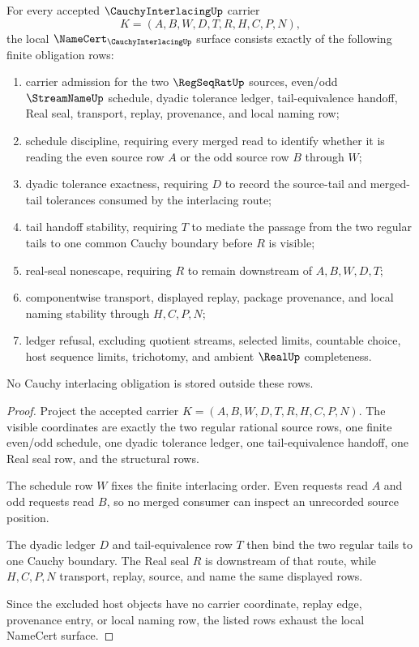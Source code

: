 \begin{theorem}
\label{thm:cauchy-interlacing-namecert-obligations}
For every accepted $\CauchyInterlacingUp$ carrier
$$
K=(A,B,W,D,T,R,H,C,P,N),
$$
the local $\NameCert_{\CauchyInterlacingUp}$ surface consists exactly of the following finite obligation rows:
\begin{enumerate}
\item carrier admission for the two $\RegSeqRatUp$ sources, even/odd $\StreamNameUp$ schedule, dyadic tolerance ledger, tail-equivalence handoff, Real seal, transport, replay, provenance, and local naming row;
\item schedule discipline, requiring every merged read to identify whether it is reading the even source row $A$ or the odd source row $B$ through $W$;
\item dyadic tolerance exactness, requiring $D$ to record the source-tail and merged-tail tolerances consumed by the interlacing route;
\item tail handoff stability, requiring $T$ to mediate the passage from the two regular tails to one common Cauchy boundary before $R$ is visible;
\item real-seal nonescape, requiring $R$ to remain downstream of $A,B,W,D,T$;
\item componentwise transport, displayed replay, package provenance, and local naming stability through $H,C,P,N$;
\item ledger refusal, excluding quotient streams, selected limits, countable choice, host sequence limits, trichotomy, and ambient $\RealUp$ completeness.
\end{enumerate}
No Cauchy interlacing obligation is stored outside these rows.
\end{theorem}

\begin{proof}
Project the accepted carrier $K=(A,B,W,D,T,R,H,C,P,N)$. The visible coordinates are exactly the two regular rational source rows, one finite even/odd schedule, one dyadic tolerance ledger, one tail-equivalence handoff, one Real seal row, and the structural rows.

The schedule row $W$ fixes the finite interlacing order. Even requests read $A$ and odd requests read $B$, so no merged consumer can inspect an unrecorded source position.

The dyadic ledger $D$ and tail-equivalence row $T$ then bind the two regular tails to one Cauchy boundary. The Real seal $R$ is downstream of that route, while $H,C,P,N$ transport, replay, source, and name the same displayed rows.

Since the excluded host objects have no carrier coordinate, replay edge, provenance entry, or local naming row, the listed rows exhaust the local NameCert surface.
\end{proof}

